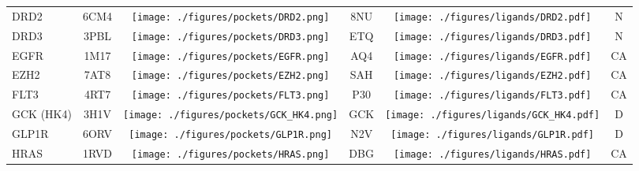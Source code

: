 \begin{ThreePartTable}
\begin{longtable}{ l @{\extracolsep{\fill}} *{5}{c} }
DRD2                                  & 6CM4            &      \texttt{[image: ./figures/pockets/DRD2.png]}                     & 8NU                    &\texttt{[image: ./figures/ligands/DRD2.pdf]}                                               & N                             \\
DRD3                                  & 3PBL            &       \texttt{[image: ./figures/pockets/DRD3.png]}                    & ETQ                    &\texttt{[image: ./figures/ligands/DRD3.pdf]}                                              & N                             \\
EGFR                                  & 1M17            &       \texttt{[image: ./figures/pockets/EGFR.png]}                    & AQ4                    &\texttt{[image: ./figures/ligands/EGFR.pdf]}                                              & CA                                              \\
EZH2                                  & 7AT8            &        \texttt{[image: ./figures/pockets/EZH2.png]}                   & SAH                    &\texttt{[image: ./figures/ligands/EZH2.pdf]}                                             & CA                                              \\
FLT3                                  & 4RT7            &          \texttt{[image: ./figures/pockets/FLT3.png]}                 & P30                    &\texttt{[image: ./figures/ligands/FLT3.pdf]}                                           & CA                                              \\
GCK (HK4)                             & 3H1V            &      \texttt{[image: ./figures/pockets/GCK\_HK4.png]}                     & GCK                    &\texttt{[image: ./figures/ligands/GCK\_HK4.pdf]}                                               & D                                            \\
GLP1R                                 & 6ORV            &      \texttt{[image: ./figures/pockets/GLP1R.png]}                     & N2V                    &\texttt{[image: ./figures/ligands/GLP1R.pdf]}                                               & D                                            \\
HRAS                                  & 1RVD            &       \texttt{[image: ./figures/pockets/HRAS.png]}                    & DBG                    &\texttt{[image: ./figures/ligands/HRAS.pdf]}                                              & CA                                              \\

\end{longtable}
\end{ThreePartTable}
